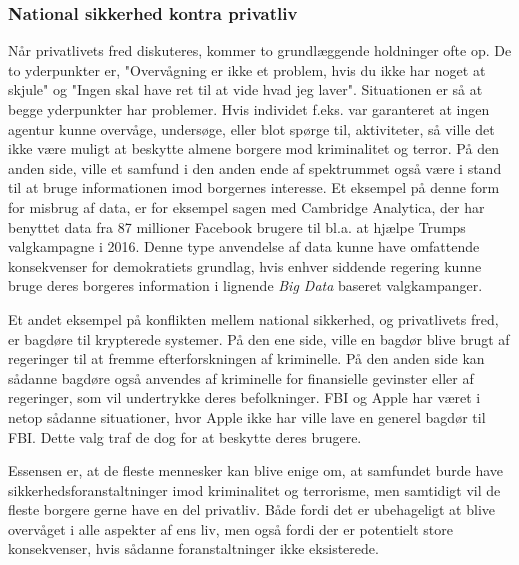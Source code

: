 \subsubsection{National sikkerhed kontra privatliv}
\label{national_privatliv}
Når privatlivets fred diskuteres, kommer to grundlæggende holdninger ofte op. De to yderpunkter er, "Overvågning er ikke et problem, hvis du ikke har noget at skjule" og "Ingen skal have ret til at vide hvad jeg laver". Situationen er så at begge yderpunkter har problemer. Hvis individet f.eks. var garanteret at ingen agentur kunne overvåge, undersøge, eller blot spørge til, aktiviteter, så ville det ikke være muligt at beskytte almene borgere mod kriminalitet og terror. På den anden side, ville et samfund i den anden ende af spektrummet også være i stand til at bruge informationen imod borgernes interesse. 
Et eksempel på denne form for misbrug af data, er for eksempel sagen med Cambridge Analytica, der har benyttet data fra 87 millioner Facebook brugere til bl.a. at hjælpe Trumps valgkampagne i 2016.\cite{Cambridge_Analytica_Zuckerberg} Denne type anvendelse af data kunne have omfattende konsekvenser for demokratiets grundlag, hvis enhver siddende regering kunne bruge deres borgeres information i lignende \textit{Big Data} baseret valgkampanger. 

Et andet eksempel på konflikten mellem national sikkerhed, og privatlivets fred, er bagdøre til krypterede systemer. På den ene side, ville en bagdør blive brugt af regeringer til at fremme efterforskningen af kriminelle. På den anden side kan sådanne bagdøre også anvendes af kriminelle for finansielle gevinster eller af regeringer, som vil undertrykke deres befolkninger. FBI og Apple har været i netop sådanne situationer, hvor Apple ikke har ville lave en generel bagdør til FBI. Dette valg traf de dog for at beskytte deres brugere.\cite{FBI/Apple_encryption}

Essensen er, at de fleste mennesker kan blive enige om, at samfundet burde have sikkerhedsforanstaltninger imod kriminalitet og terrorisme, men samtidigt vil de fleste borgere gerne have en del privatliv. Både fordi det er ubehageligt at blive overvåget i alle aspekter af ens liv, men også fordi der er potentielt store konsekvenser, hvis sådanne foranstaltninger ikke eksisterede.


